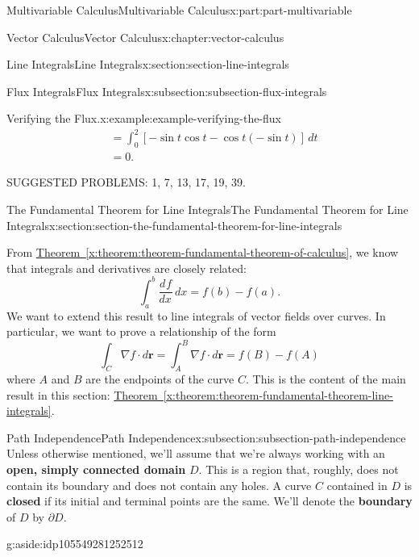 \documentclass[twoside,10pt,]{book}
\newcommand{\xreffont}{\relax}
\newcommand{\terminology}[1]{\textbf{#1}}
\numberwithin{equation}{part}
\newcommand{\grad}{\nabla}
\newcommand{\vb}[1]{\mathbf{#1}}
\newcommand{\dv}[3][]{\dfrac{d^{#1} #2}{d #3^{#1}}}
\newcommand{\brackets}[1]{\left[ #1 \right]}
\newcommand{\amp}{&}
\begin{document}
\begin{partptx}{Multivariable Calculus}{}{Multivariable Calculus}{}{}{x:part:part-multivariable}
\begin{chapterptx}{Vector Calculus}{}{Vector Calculus}{}{}{x:chapter:vector-calculus}
\begin{sectionptx}{Line Integrals}{}{Line Integrals}{}{}{x:section:section-line-integrals}
\begin{subsectionptx}{Flux Integrals}{}{Flux Integrals}{}{}{x:subsection:subsection-flux-integrals}
\begin{example}{Verifying the Flux.}{x:example:example-verifying-the-flux}
\begin{align*}
\amp = \int_{0}^{2}\brackets{-\sin t\cos t - \cos t(-\sin t)}\,dt \\
\amp = 0 \text{.}
\end{align*}
%
\end{example}
\end{subsectionptx}
\begin{conclusion}{}%
SUGGESTED PROBLEMS: 1, 7, 13, 17, 19, 39.%
\end{conclusion}%
\end{sectionptx}
%
%
\typeout{************************************************}
\typeout{************************************************}
%
\begin{sectionptx}{The Fundamental Theorem for Line Integrals}{}{The Fundamental Theorem for Line Integrals}{}{}{x:section:section-the-fundamental-theorem-for-line-integrals}
\begin{introduction}{}%
From \hyperref[x:theorem:theorem-fundamental-theorem-of-calculus]{Theorem~{\xreffont\ref{x:theorem:theorem-fundamental-theorem-of-calculus}}}, we know that integrals and derivatives are closely related:%
\begin{equation*}
\int_{a}^{b}\dv{f}{x}\,dx = f(b) - f(a)\text{.}
\end{equation*}
We want to extend this result to line integrals of vector fields over curves. In particular, we want to prove a relationship of the form%
\begin{equation*}
\int_{C}\grad f\cdot d\vb{r} = \int_{A}^{B}\grad f\cdot d\vb{r} = f(B) - f(A)
\end{equation*}
where \(A\) and \(B\) are the endpoints of the curve \(C\). This is the content of the main result in this section: \hyperref[x:theorem:theorem-fundamental-theorem-line-integrals]{Theorem~{\xreffont\ref{x:theorem:theorem-fundamental-theorem-line-integrals}}}.%
\end{introduction}%
%
%
\typeout{************************************************}
\typeout{************************************************}
%
\begin{subsectionptx}{Path Independence}{}{Path Independence}{}{}{x:subsection:subsection-path-independence}
Unless otherwise mentioned, we'll assume that we're always working with an \terminology{open, simply connected domain} \(D\). This is a region that, roughly, does not contain its boundary and does not contain any holes. A curve \(C\) contained in \(D\) is \terminology{closed} if its initial and terminal points are the same. We'll denote the \terminology{boundary} of \(D\) by \(\partial D\). \begin{aside}{}{g:aside:idp105549281252512}%

\end{aside}
\end{subsectionptx}
\end{sectionptx}
\end{chapterptx}
\end{partptx}
\end{document}

